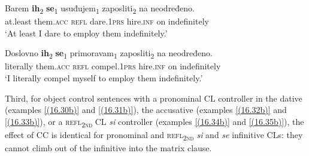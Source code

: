 \begin{exe}
\gll Barem \textbf{ih}\textsubscript{2} \textbf{se}\textsubscript{1} usuđujem\textsubscript{1} zaposliti\textsubscript{2} na neodređeno. \\
 at.least them.\textsc{acc} \textsc{refl} dare.1\textsc{prs} hire.\textsc{inf} on indefinitely \\
\glt ‘At least I dare to employ them indefinitely.’

\gll Doslovno \textbf{ih}\textsubscript{2} \textbf{se}\textsubscript{1} primoravam\textsubscript{1} zaposliti\textsubscript{2} na neodređeno. \\
 literally them.\textsc{acc} \textsc{refl} compel.1\textsc{prs} hire.\textsc{inf} on indefinitely \\
\glt ‘I literally compel myself to employ them indefinitely.’
\end{exe}
 
\noindent  Third, for object control sentences with a pronominal CL controller in the dative (examples \ref{(16.30b)} and \ref{(16.31b)}), the accusative (examples \ref{(16.32b)} and \ref{(16.33b)}), or a \textsc{refl\textsubscript{2nd}} CL \textit{si} controller (examples \ref{(16.34b)} and \ref{(16.35b)}), the effect of CC is identical for pronominal and \textsc{refl\textsubscript{2nd}} \textit{si} and \textit{se} infinitive CLs: they cannot climb out of the infinitive into the matrix clause.


